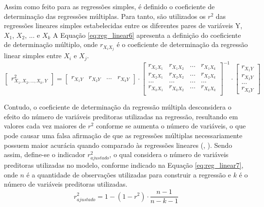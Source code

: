 Assim como feito para as regressões simples, é definido o coeficiente de determinação das regressões múltiplas.
Para tanto, são utilizados os $r^2$ das regressões lineares simples estabelecidas entre os diferentes pares de variáveis Y, $X_{1}$, $X_{2}$, ... e $X_{k}$
A Equação \ref{eq:reg_linear6} apresenta a definição do coeficiente de determinação múltiplo, onde $r_{X_{i}X_{j}}$ é o coeficiente de determinação da regressão linear simples entre $X_{i}$ e $X_{j}$. 
%
\begin{equation} \label{eq:reg_linear6}
    \begin{bmatrix}
    r_{X_{1},X_{2},...,X_{k},Y}^2 
    \end{bmatrix} = 
    \begin{bmatrix}
    r_{X_{1}Y} & r_{X_{2}Y} & ... & r_{X_{k}Y}
    \end{bmatrix} \cdot
    \begin{bmatrix}
    r_{X_{1}X_{1}} & r_{X_{1}X_{2}} & ... & r_{X_{1}X_{k}} \\
    r_{X_{2}X_{1}} & r_{X_{2}X_{2}} & ... & r_{X_{2}X_{k}} \\
    ... & ... & ... & ... \\
    r_{X_{k}X_{1}} & r_{X_{k}X_{2}} & ... & r_{X_{k}X_{k}} \\
    \end{bmatrix}^{-1} \cdot
    \begin{bmatrix}
    r_{X_{1}Y} \\ r_{X_{2}Y} \\ ... \\ r_{X_{k}Y}
    \end{bmatrix}
\end{equation}

Contudo, o coeficiente de determinação da regressão múltipla desconsidera o efeito do número de variáveis preditoras utilizadas na regressão, resultando em valores cada vez maiores de $r^{2}$ conforme se aumenta o número de variáveis, o que pode causar uma falsa afirmação de que as regressões múltiplas necessariamente possuem maior acurácia quando comparado às regressões lineares (, \citeyear{Chein2019}).
Sendo assim, define-se o indicador $r^2_{ajustado}$, o qual considera o número de variáveis preditoras utilizadas no modelo, conforme indicado na Equação \ref{eq:reg_linear7}, onde $n$ é a quantidade de observações utilizadas para construir a regressão e $k$ é o número de variáveis preditoras utilizadas.
%
\begin{equation} \label{eq:reg_linear7}
    r^2_{ajustado} = 1 - (1 - r^2) \cdot \frac{n - 1}{n - k - 1}
\end{equation}

